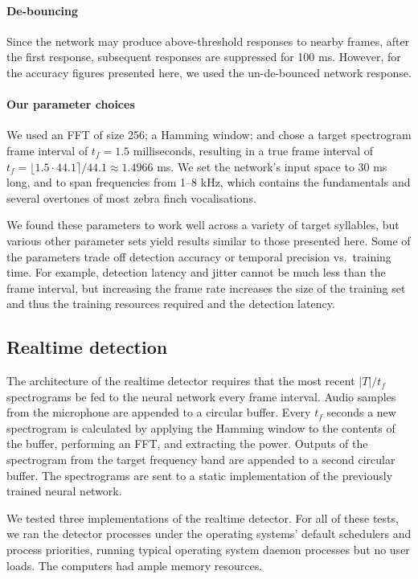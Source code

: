 \documentclass[10pt,letterpaper]{article}
\renewcommand{\subsubsection}[1]{\paragraph{#1}}
\begin{document}
\subsubsection{De-bouncing}

Since the network may produce above-threshold responses to nearby frames, after the first response, subsequent responses are suppressed for 100 ms.  However, for the accuracy figures presented here, we used the un-de-bounced network response.

\subsubsection{Our parameter choices}

We used an FFT of size 256; a Hamming window; and chose a target spectrogram
frame interval of $t_f=1.5$ milliseconds, resulting in a true frame interval of $t_f=\lfloor 1.5\cdot 44.1\rceil /44.1\approx 1.4966$ ms.  We set the network's input
space to 30 ms long, and to span frequencies from 1--8 kHz, which
contains the fundamentals and several overtones of most zebra finch
vocalisations.

We found these parameters to work well across a variety of target
syllables, but various other parameter sets yield results similar to those
presented here.  Some of the parameters trade off detection accuracy
or temporal precision vs.~training time. For example, detection latency
and jitter cannot be much less than the frame interval, but increasing the
frame rate increases the size of the training set and thus the
training resources required and the detection latency.

\subsection{Realtime detection}

The architecture of the realtime detector requires that the most
recent $|T|/t_f$ spectrograms be fed to the neural network every
frame interval.  Audio samples from the microphone
are appended to a circular buffer.  Every $t_f$ seconds a new
spectrogram is calculated by applying the Hamming window to the
contents of the buffer, performing an FFT, and extracting the
power. Outputs of the spectrogram from the target frequency band are
appended to a second circular buffer.  The spectrograms are sent to a
static implementation of the previously trained neural network.

We tested three implementations of the realtime detector.  For all of
these tests, we ran the detector processes under the operating
systems' default schedulers and process priorities, running typical
operating system daemon processes but no user loads.  The computers
had ample memory resources.
\end{document}
